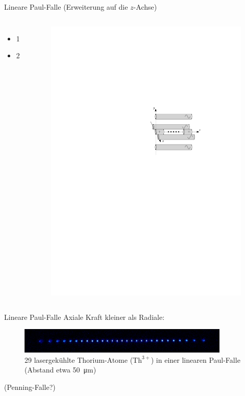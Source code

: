 \documentclass[12pt,xcolor=dvipsnames]{beamer}
\begin{document}
\begin{frame}{Lineare Paul-Falle (Erweiterung auf die $z$-Achse)}
	\begin{columns}[t]
		\begin{itemize}
			\item 1
			\item 2
		\end{itemize}
			\begin{figure}[h]
				\centering
				\includegraphics[width = 1\textwidth]{./figures/lineare_paulfalle.pdf}
			\end{figure}
	\end{columns}

\end{frame}

\begin{frame}{Lineare Paul-Falle}
Axiale Kraft kleiner als Radiale:
\begin{figure}[h]
	\centering
	\includegraphics[width=0.9\textwidth]{./figures/29_laser_cooled_ion_chain.jpg}
	\caption{29 lasergekühlte Thorium-Atome ($\mathrm{Th}^{3+}$) in einer linearen Paul-Falle (Abstand etwa \SI{50}{\micro\metre}) \cite{campbell}}
\end{figure}

(Penning-Falle?)

\end{frame}
\end{document}
